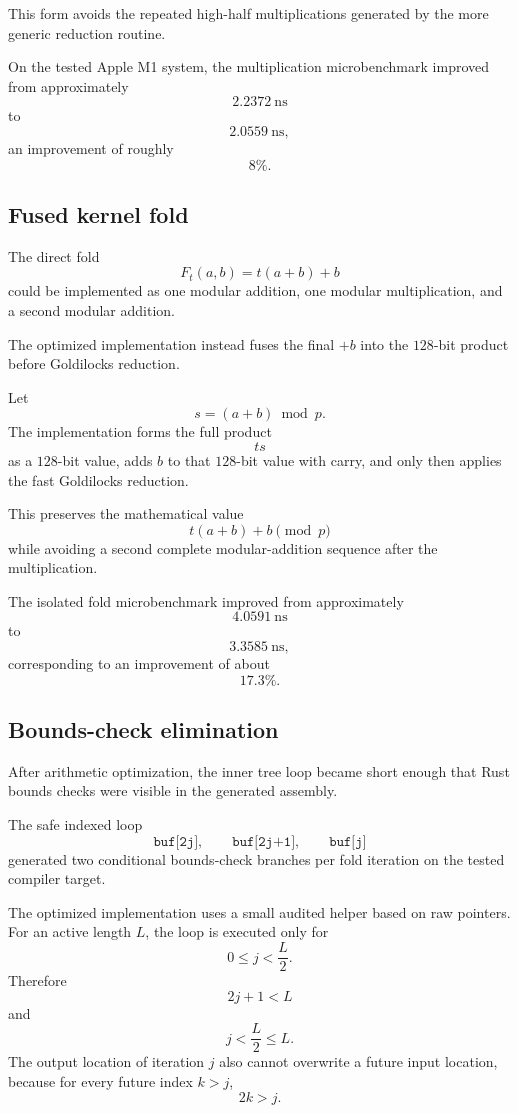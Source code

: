 This form avoids the repeated high-half multiplications generated by the
more generic reduction routine.

On the tested Apple M1 system, the multiplication microbenchmark improved
from approximately
\[
2.2372\ \mathrm{ns}
\]
to
\[
2.0559\ \mathrm{ns},
\]
an improvement of roughly
\[
8\%.
\]

\subsection{Fused kernel fold}

The direct fold
\[
F_t(a,b)=t(a+b)+b
\]
could be implemented as one modular addition, one modular multiplication,
and a second modular addition.

The optimized implementation instead fuses the final \(+b\) into the
\(128\)-bit product before Goldilocks reduction.

Let
\[
s=(a+b)\bmod p.
\]
The implementation forms the full product
\[
t s
\]
as a \(128\)-bit value, adds \(b\) to that \(128\)-bit value with carry,
and only then applies the fast Goldilocks reduction.

This preserves the mathematical value
\[
t(a+b)+b
\pmod p
\]
while avoiding a second complete modular-addition sequence after the
multiplication.

The isolated fold microbenchmark improved from approximately
\[
4.0591\ \mathrm{ns}
\]
to
\[
3.3585\ \mathrm{ns},
\]
corresponding to an improvement of about
\[
17.3\%.
\]

\subsection{Bounds-check elimination}

After arithmetic optimization, the inner tree loop became short enough
that Rust bounds checks were visible in the generated assembly.

The safe indexed loop
\[
\texttt{buf[2j]},\qquad
\texttt{buf[2j+1]},\qquad
\texttt{buf[j]}
\]
generated two conditional bounds-check branches per fold iteration on the
tested compiler target.

The optimized implementation uses a small audited helper based on raw
pointers.  For an active length \(L\), the loop is executed only for
\[
0\le j<\frac{L}{2}.
\]
Therefore
\[
2j+1<L
\]
and
\[
j<\frac{L}{2}\le L.
\]
The output location of iteration \(j\) also cannot overwrite a future input
location, because for every future index \(k>j\),
\[
2k>j.
\]

